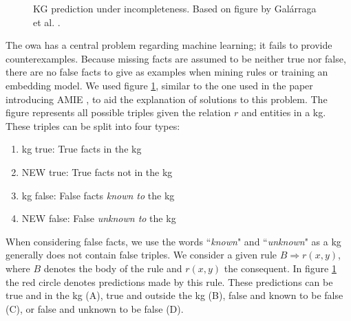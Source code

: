 \begin{figure}[htp]
    \centering
    
    \caption{KG prediction under incompleteness. Based on figure by Galárraga et al. \cite{amie}.}
    \label{KB_predictions}
\end{figure}

The \gls{owa} has a central problem regarding machine learning; it fails to provide counterexamples. Because missing facts are assumed to be neither true nor false, there are no false facts to give as examples when mining rules or training an embedding model. We used figure \ref{KB_predictions}, similar to the one used in the paper introducing AMIE \cite{amie}, to aid the explanation of solutions to this problem. The figure represents all possible triples given the relation $r$ and entities in a \gls{kg}. These triples can be split into four types:
\begin{enumerate}
    \item \gls{kg} true: True facts in the \gls{kg}
    \item NEW true: True facts not in the \gls{kg}
    \item \gls{kg} false: False facts \textit{known to} the \gls{kg}
    \item NEW false: False \textit{unknown to} the \gls{kg}
\end{enumerate}
When considering false facts, we use the words ``\textit{known}" and ``\textit{unknown}" as a \gls{kg} generally does not contain false triples. We consider a given rule $B \Rightarrow r(x, y)$, where $B$ denotes the body of the rule and $r(x, y)$ the consequent. In figure \ref{KB_predictions} the red circle denotes predictions made by this rule. These predictions can be true and in the \gls{kg} (A), true and outside the \gls{kg} (B), false and known to be false (C), or false and unknown to be false (D). 

